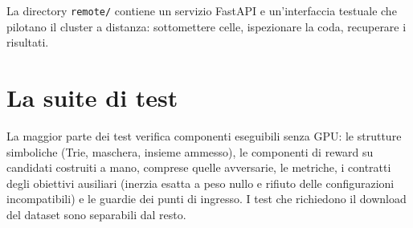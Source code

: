 La directory \texttt{remote/} contiene un servizio FastAPI e un'interfaccia
testuale che pilotano il cluster a distanza: sottomettere celle, ispezionare la
coda, recuperare i risultati.

\section{La suite di test}

La maggior parte dei test verifica componenti eseguibili senza GPU: le
strutture simboliche (Trie, maschera, insieme ammesso), le componenti di reward
su candidati costruiti a mano, comprese quelle avversarie, le metriche, i
contratti degli obiettivi ausiliari (inerzia esatta a peso nullo e rifiuto delle
configurazioni incompatibili) e le guardie dei punti di ingresso. I test che
richiedono il download del dataset sono separabili dal resto.
